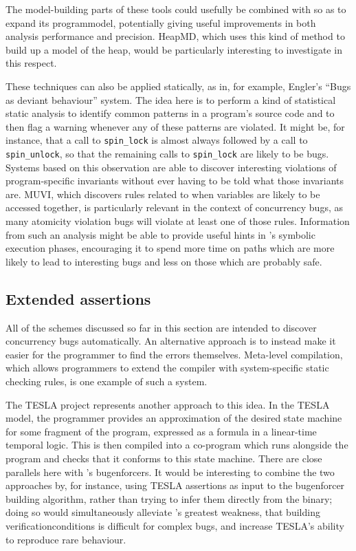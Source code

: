 The model-building parts of these tools could usefully be combined
with {\technique} so as to expand its \gls{programmodel}, potentially
giving useful improvements in both analysis performance and precision.
HeapMD\cite{Chilimbi2006}, which uses this kind of method to build up
a model of the heap, would be particularly interesting to investigate
in this respect.

These techniques can also be applied statically, as in, for example,
Engler's ``Bugs as deviant behaviour'' system\cite{Engler2001}.  The
idea here is to perform a kind of statistical static analysis to
identify common patterns in a program's source code and to then flag a
warning whenever any of these patterns are violated.  It might be, for
instance, that a call to \texttt{spin\_lock} is almost always followed
by a call to \texttt{spin\_unlock}, so that the remaining calls to
\texttt{spin\_lock} are likely to be bugs.  Systems based on this
observation are able to discover interesting violations of
program-specific invariants without ever having to be told what those
invariants are.  MUVI\cite{Lu2007}, which discovers rules related to
when variables are likely to be accessed together, is particularly
relevant in the context of concurrency bugs, as many atomicity
violation bugs will violate at least one of those rules.  Information
from such an analysis might be able to provide useful hints in
{\technique}'s symbolic execution phases, encouraging it to spend more
time on paths which are more likely to lead to interesting bugs and
less on those which are probably safe.

\subsection{Extended assertions}

All of the schemes discussed so far in this section are intended to
discover concurrency bugs automatically.  An alternative approach is
to instead make it easier for the programmer to find the errors
themselves.  Meta-level compilation\cite{Engler2000a}, which allows
programmers to extend the compiler with system-specific static
checking rules, is one example of such a system. 

The TESLA project\cite{Watson2013,Locielski2011} represents another approach to this idea.  In the
TESLA model, the programmer provides an approximation of the desired
state machine for some fragment of the program, expressed as a formula
in a linear-time temporal logic.  This is then compiled into a
co-program which runs alongside the program and checks that it
conforms to this state machine.  There are close parallels here with
{\technique}'s \glspl{bugenforcer}.  It would be interesting to
combine the two approaches by, for instance, using TESLA assertions as
input to the \gls{bugenforcer} building algorithm, rather than trying
to infer them directly from the binary; doing so would simultaneously
alleviate {\technique}'s greatest weakness, that building
\glspl{verificationcondition} is difficult for complex bugs, and
increase TESLA's ability to reproduce rare behaviour.

